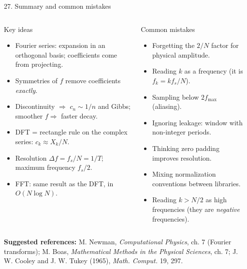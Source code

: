 \documentclass[aspectratio=169,10pt]{beamer}
\begin{document}
\begin{frame}{27. Summary and common mistakes}
  \footnotesize
  \begin{columns}[T]
    \begin{keybox}{Key ideas}
      \begin{itemize}
        \item Fourier series: expansion in an orthogonal basis; coefficients come from projecting.
        \item Symmetries of $f$ remove coefficients \emph{exactly}.
        \item Discontinuity $\Rightarrow$ $c_n\sim1/n$ and Gibbs; smoother $f\Rightarrow$ faster decay.
        \item DFT = rectangle rule on the complex series: $c_k\approx X_k/N$.
        \item Resolution $\Delta f=f_s/N=1/T$; maximum frequency $f_s/2$.
        \item FFT: same result as the DFT, in $O(N\log N)$.
      \end{itemize}
    \end{keybox}
    \begin{warnbox}{Common mistakes}
      \begin{itemize}
        \item Forgetting the $2/N$ factor for physical amplitude.
        \item Reading $k$ as a frequency (it is $f_k=kf_s/N$).
        \item Sampling below $2f_{\max}$ (aliasing).
        \item Ignoring leakage: window with non-integer periods.
        \item Thinking zero padding improves resolution.
        \item Mixing normalization conventions between libraries.
        \item Reading $k>N/2$ as high frequencies (they are \emph{negative} frequencies).
      \end{itemize}
    \end{warnbox}
  \end{columns}
  \vspace{2pt}
  \footnotesize\textbf{Suggested references:} M. Newman, \emph{Computational Physics}, ch. 7 (Fourier transforms); M. Boas, \emph{Mathematical Methods in the Physical Sciences}, ch. 7; J. W. Cooley and J. W. Tukey (1965), \emph{Math. Comput.} 19, 297.
\end{frame}
\end{document}
